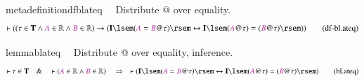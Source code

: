 \begin{restatable}{metadefinition}{dfblateq}~~ Distribute @ over equality.
\begin{align}
\vdash ( ( \tau \in \mathbf{T} \wedge \mc{A} \in \mathbb{R} \wedge \mc{B} \in
    \mathbb{R} ) \rightarrow ( \mathbf{I} \lsem ( \mc{A} = \mc{B} @ \tau )
    \rsem \leftrightarrow \mathbf{I} \lsem ( \mc{A} @ \tau ) = ( \mc{B} @ \tau
    ) \rsem ) )\label{eq:df-bl.ateq}\tag{df-bl.ateq}
\end{align}
\end{restatable}

\begin{restatable}{lemma}{blateq}~~ Distribute @ over equality, inference.
\begin{align}
\vdash \tau \in \mathbf{T}\quad\&\quad \vdash ( \mc{A} \in \mathbb{R} \wedge
    \mc{B} \in \mathbb{R} )\quad\Rightarrow\quad \vdash ( \mathbf{I} \lsem (
    \mc{A} = \mc{B} @ \tau ) \rsem \leftrightarrow \mathbf{I} \lsem ( \mc{A} @
    \tau ) = ( \mc{B} @ \tau ) \rsem )\label{eq:bl.ateq}\tag{bl.ateq}
\end{align}
\end{restatable}

